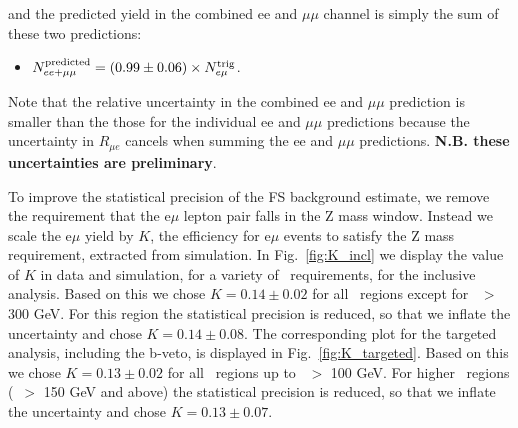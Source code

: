 and the predicted yield in the combined ee and $\mu\mu$ channel is simply the sum of these two predictions:

\begin{itemize}
\item $N_{ee+\mu\mu}^{\rm{predicted}} = (0.99\pm0.06)\times N_{e\mu}^{\rm{trig}}$.
\end{itemize}

Note that the relative uncertainty in the combined ee and $\mu\mu$ prediction is smaller than the those for the individual ee and $\mu\mu$ predictions
because the uncertainty in $R_{\mu e}$ cancels when summing the ee and $\mu\mu$ predictions. {\bf N.B. these uncertainties are preliminary}.

To improve the statistical precision of the FS background estimate, we remove the requirement that the e$\mu$ lepton pair falls in the Z mass window.
Instead we scale the e$\mu$ yield by $K$, the efficiency for e$\mu$ events to satisfy the Z mass requirement, extracted from simulation. In Fig.~\ref{fig:K_incl}
we display the value of $K$ in data and simulation, for a variety of \MET\ requirements, for the inclusive analysis. Based on this we chose $K=0.14\pm0.02$
for all \MET\ regions except for \MET\ $>$ 300 GeV. For this region the statistical precision is reduced, so that we inflate the uncertainty and chose $K=0.14\pm0.08$.
The corresponding plot for the targeted analysis, including the b-veto, is displayed in Fig.~\ref{fig:K_targeted}.
Based on this we chose $K=0.13\pm0.02$
for all \MET\ regions up to  \MET\ $>$ 100 GeV. For higher \MET\ regions (\MET\ $>$ 150 GeV and above) the statistical precision is reduced, 
so that we inflate the uncertainty and chose $K=0.13\pm0.07$.

